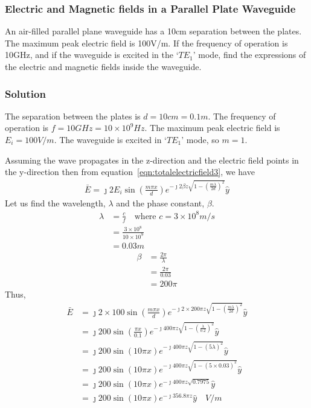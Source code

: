 \begin{exmp}
\subsubsection*{Electric and Magnetic fields in a Parallel Plate Waveguide}
An air-filled parallel plane waveguide has a 10cm separation between the plates. The maximum peak electric field is 100V/m. If the frequency of operation is 10GHz, and if the waveguide is excited in the `$TE_{1}$' mode, find the expressions of the electric and magnetic fields inside the waveguide.

\subsubsection*{Solution}
The separation between the plates is $d = 10cm = 0.1m$. The frequency of operation is $f = 10GHz = 10\times 10^9Hz$. The maximum peak electric field is $E_i = 100V/m$. The waveguide is excited in `$TE_{1}$' mode, so $m=1$.

Assuming the wave propagates in the z-direction and the electric field points in the y-direction then from equation~\eqref{eqn:totalelectricfield3}, we have
\begin{align*}
\bar{E} = \jmath 2E_i\sin(\frac{m\pi x}{d})e^{-\jmath 2\beta z\sqrt{1 - \left(\frac{m\lambda}{2d}\right)^2}}\hat{y}
\end{align*}
Let us find the wavelength, $\lambda$ and the phase constant, $\beta$.
\begin{align*}
\lambda &= \frac{c}{f}\quad\text{where } c = 3\times 10^8m/s\\
&= \frac{3\times 10^8}{10\times 10^9}\\
&= 0.03m
\end{align*}
\begin{align*}
\beta &= \frac{2\pi}{\lambda}\\
&= \frac{2\pi}{0.03}\\
&= 200\pi
\end{align*}
Thus,
\begin{align*}
\bar{E} &= \jmath 2\times100\sin(\frac{m\pi x}{d})e^{-\jmath 2\times200\pi z\sqrt{1 - \left(\frac{m\lambda}{2d}\right)^2}}\hat{y}\\
&= \jmath 200\sin(\frac{\pi x}{0.1})e^{-\jmath 400\pi z\sqrt{1 - \left(\frac{\lambda}{0.2}\right)^2}}\hat{y}\\
&= \jmath 200\sin(10\pi x)e^{-\jmath 400\pi z\sqrt{1 - {(5\lambda)}^2}}\hat{y}\\
&= \jmath 200\sin(10\pi x)e^{-\jmath 400\pi z\sqrt{1 - {(5\times0.03)}^2}}\hat{y}\\
&= \jmath 200\sin(10\pi x)e^{-\jmath 400\pi z\sqrt{0.7975}}\hat{y}\\
&= \jmath 200\sin(10\pi x)e^{-\jmath 356.8\pi z}\hat{y}\quad V/m
\end{align*}


\end{exmp}
